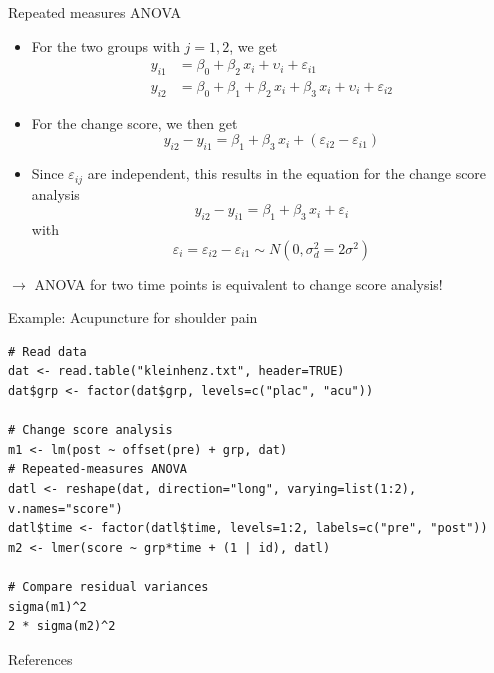 \documentclass[aspectratio=169]{beamer}
\begin{document}
\begin{frame}{Repeated measures ANOVA}
\begin{itemize}
  \item For the two groups with $j = 1, 2$, we get
    \begin{align*}
      y_{i1} &= \beta_0 + \beta_2 \, x_i + \upsilon_i + \varepsilon_{i1}\\
      y_{i2} &= \beta_0 + \beta_1 + \beta_2 \, x_i + \beta_3 \, x_i + \upsilon_i + \varepsilon_{i2}
    \end{align*}
  \vspace{-.4cm}
  \item For the change score, we then get
    \[
      y_{i2} - y_{i1} = \beta_1 + \beta_3 \, x_i + (\varepsilon_{i2} - \varepsilon_{i1})
    \]
  \vspace{-.4cm}
  \item Since $\varepsilon_{ij}$ are independent, this results in the
    equation for the change score analysis
    \[
        y_{i2} - y_{i1} = \beta_1 + \beta_3 \, x_i + \varepsilon_{i}
    \]
    with
    \[
        \varepsilon_i = \varepsilon_{i2} - \varepsilon_{i1} \sim N(0, \sigma_d^2 = 2 \sigma^2)
    \]
\end{itemize}
  \vspace{-.3cm}
  $\to$ ANOVA for two time points is equivalent to change score analysis!
\end{frame}

\begin{frame}[fragile]{Example: Acupuncture for shoulder pain}
\begin{lstlisting}
# Read data
dat <- read.table("kleinhenz.txt", header=TRUE)
dat$grp <- factor(dat$grp, levels=c("plac", "acu"))

# Change score analysis
m1 <- lm(post ~ offset(pre) + grp, dat)
# Repeated-measures ANOVA
datl <- reshape(dat, direction="long", varying=list(1:2), v.names="score")
datl$time <- factor(datl$time, levels=1:2, labels=c("pre", "post"))
m2 <- lmer(score ~ grp*time + (1 | id), datl)

# Compare residual variances
sigma(m1)^2
2 * sigma(m2)^2
\end{lstlisting}
\end{frame}


% 
% 

\begin{frame}{References}
  \printbibliography
  \vfill
\end{frame}
\end{document}
